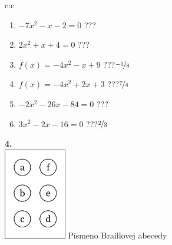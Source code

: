 \documentclass[10pt]{report}
\begin{document}
\begin{tabular}{c:c}
\begin{minipage}[c][104.5mm][t]{0.5\linewidth}
\begin{center}
\begin{minipage}{0.79\linewidth}
\begin{center}
\begin{varwidth}{\linewidth}
\begin{enumerate}
\Large
\item $-7x^2-x-2=0$\quad \dotfill\; ???\;\dotfill {}
\item $2x^2+x+4=0$\quad \dotfill\; ???\;\dotfill {}
\item $f(x)=-4x^2-x+9$\quad \dotfill\; ???\;\dotfill \quad $\nicefrac{-1}{8}$
\item $f(x)=-4x^2+2x+3$\quad \dotfill\; ???\;\dotfill \quad $\nicefrac{7}{4}$
\item $-2x^2-26x-84=0$\quad \dotfill\; ???\;\dotfill {}
\item $3x^2-2x-16=0$\quad \dotfill\; ???\;\dotfill \quad $\nicefrac{2}{3}$
\end{enumerate}
\end{varwidth}
\end{center}
\end{minipage}
\begin{minipage}{0.20\linewidth}
\begin{center}
{\Huge\bfseries 4.} \\[2mm]
\includegraphics[height=40mm]{../images/braille.png}
{\small Písmeno Braillovej abecedy}
\end{center}
\end{minipage}
\end{center}
\end{minipage}
%
\end{tabular}
\newpage
\thispagestyle{empty}
\end{document}
